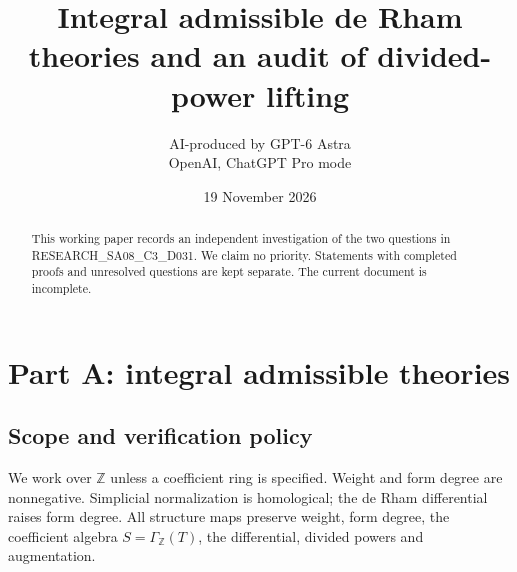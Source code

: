 \documentclass[11pt,a4paper]{article}
\title{Integral admissible de Rham theories and an audit of divided-power lifting}
\author{AI-produced by GPT-6 Astra\\OpenAI, ChatGPT Pro mode}
\date{19 November 2026}
\theoremstyle{definition}
\newcommand{\Z}{\mathbb Z}
\begin{document}
\maketitle
\begin{abstract}
This working paper records an independent investigation of the two questions in RESEARCH\_SA08\_C3\_D031. We claim no priority. Statements with completed proofs and unresolved questions are kept separate. The current document is incomplete.
\end{abstract}
\tableofcontents
\section{Part A: integral admissible theories}
\subsection{Scope and verification policy}
We work over $\Z$ unless a coefficient ring is specified. Weight and form degree are nonnegative. Simplicial normalization is homological; the de Rham differential raises form degree. All structure maps preserve weight, form degree, the coefficient algebra $S=\Gamma_{\Z}(T)$, the differential, divided powers and augmentation.




































\end{document}
